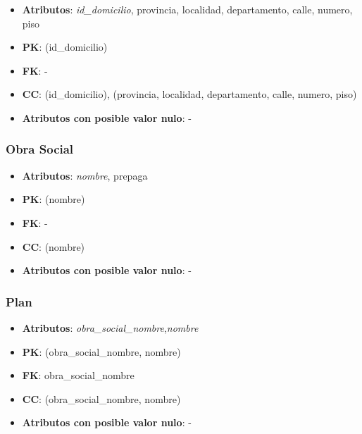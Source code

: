 \documentclass[a4paper,11pt]{article}
\begin{document}
\begin{itemize}

\item 
\textbf{Atributos}: \emph{id\_domicilio}, provincia, localidad, departamento, calle, numero, piso

\item 
\textbf{PK}: (id\_domicilio)

\item
\textbf{FK}: -

\item 
\textbf{CC}: (id\_domicilio),  (provincia, localidad, departamento, calle, numero, piso)

\item 
\textbf{Atributos con posible valor nulo}: -
\end{itemize}

\subsubsection{\textbf{Obra Social}}

\begin{itemize}

\item 
\textbf{Atributos}: \emph{nombre}, prepaga

\item 
\textbf{PK}: (nombre)

\item
\textbf{FK}: -

\item 
\textbf{CC}: (nombre)

\item 
\textbf{Atributos con posible valor nulo}: -

\end{itemize}

\subsubsection{\textbf{Plan}}

\begin{itemize}

\item 
\textbf{Atributos}: \emph{obra\_social\_nombre},\emph{nombre}

\item 
\textbf{PK}: (obra\_social\_nombre, nombre)

\item
\textbf{FK}: obra\_social\_nombre

\item 
\textbf{CC}: (obra\_social\_nombre, nombre)

\item 
\textbf{Atributos con posible valor nulo}: -

\end{itemize}
\end{document}
